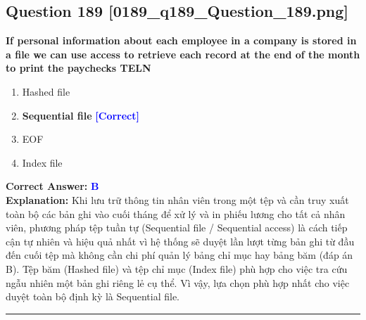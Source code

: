 \documentclass[11pt,a4paper]{article}
\begin{document}
\begin{minipage}{\textwidth}
\subsection*{Question 189 \quad \footnotesize{[0189\_q189\_Question\_189.png]}}
\noindent \textbf{If personal information about each employee in a company is stored in a file we can use access to retrieve each record at the end of the month to print the paychecks TELN}

\begin{enumerate}[label=\Alph*.]
    \item Hashed file
    \item \textbf{Sequential file} \hfill \textcolor{blue}{\textbf{[Correct]}}
    \item EOF
    \item Index file
\end{enumerate}

\noindent \textbf{Correct Answer:} \textcolor{blue}{\textbf{B}} \\[2pt]
\noindent \textbf{Explanation:} Khi lưu trữ thông tin nhân viên trong một tệp và cần truy xuất toàn bộ các bản ghi vào cuối tháng để xử lý và in phiếu lương cho tất cả nhân viên, phương pháp tệp tuần tự (Sequential file / Sequential access) là cách tiếp cận tự nhiên và hiệu quả nhất vì hệ thống sẽ duyệt lần lượt từng bản ghi từ đầu đến cuối tệp mà không cần chi phí quản lý bảng chỉ mục hay bảng băm (đáp án B). Tệp băm (Hashed file) và tệp chỉ mục (Index file) phù hợp cho việc tra cứu ngẫu nhiên một bản ghi riêng lẻ cụ thể. Vì vậy, lựa chọn phù hợp nhất cho việc duyệt toàn bộ định kỳ là Sequential file.

\par\vspace{0.3cm}
\hrule
\vspace{0.3cm}
\end{minipage}
\end{document}
